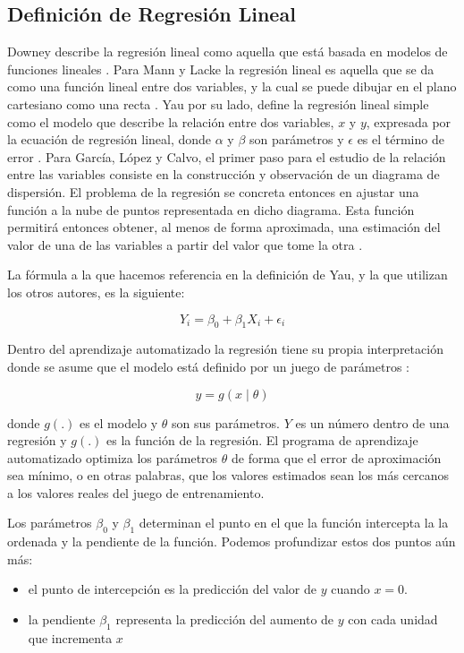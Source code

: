 \subsection{Definición de Regresión Lineal}
Downey describe la regresión lineal como aquella que está basada en modelos de funciones lineales \cite{thinkStats}. Para Mann y Lacke la regresión lineal es aquella que se da como una función lineal entre dos variables, y la cual se puede dibujar en el plano cartesiano como una recta \cite{intoStats7}. Yau por su lado, define la regresión lineal simple como el modelo que describe la relación entre dos variables, $x$ y $y$, expresada por la ecuación de regresión lineal, donde $\alpha$ y $\beta$ son parámetros y $\epsilon$ es el término de error \cite{yau}. Para García, López y Calvo, el primer paso para el estudio de la relación entre las variables consiste en la construcción y observación de un diagrama de dispersión. El problema de la regresión se concreta entonces en ajustar una función a la nube de puntos representada en dicho diagrama. Esta función permitirá entonces obtener, al menos de forma aproximada, una estimación del valor de una de las variables a partir del valor que tome la otra \cite{estadisticaBasica}.

La fórmula a la que hacemos referencia en la definición de Yau, y la que utilizan los otros autores, es la siguiente:

\begin{equation}
	Y_{i} = \beta_{0} + \beta_{1}X_{i} + \epsilon_{i}
\end{equation}

Dentro del aprendizaje automatizado la regresión tiene su propia interpretación donde se asume que el modelo está definido por un juego de parámetros \cite{alpaydin}:

\begin{equation}
	y = g(x \mid \theta)
\end{equation}

donde $g(.)$ es el modelo y $\theta$ son sus parámetros. $Y$ es un número dentro de una regresión y $g(.)$ es la función de la regresión. El programa de aprendizaje automatizado optimiza los parámetros $\theta$ de forma que el error de aproximación sea mínimo, o en otras palabras, que los valores estimados sean los más cercanos a los valores reales del juego de entrenamiento. 

Los parámetros $\beta_{0}$ y $\beta_{1}$ determinan el punto en el que la función intercepta la la ordenada y la pendiente de la función. Podemos profundizar estos dos puntos aún más:
\begin{itemize}
	\item el punto de intercepción es la predicción del valor de $y$ cuando $x=0$. 
    \item la pendiente $\beta_{1}$ representa la predicción del aumento de $y$ con cada unidad que incrementa $x$
\end{itemize}

